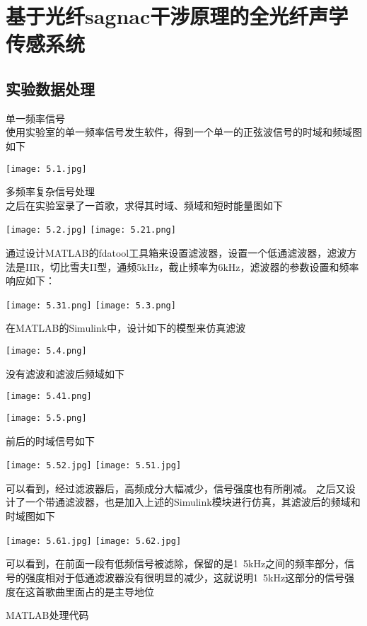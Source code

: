 \documentclass{zjureport}
\begin{document}
\section{基于光纤sagnac干涉原理的全光纤声学传感系统}
  \subsection{实验数据处理}
    \begin{clause}
    	\item 单一频率信号\\
    	使用实验室的单一频率信号发生软件，得到一个单一的正弦波信号的时域和频域图如下
    	\begin{center}
    		\texttt{[image: 5.1.jpg]}
    	\end{center}
       	\item 多频率复杂信号处理\\
       	之后在实验室录了一首歌，求得其时域、频域和短时能量图如下\\
       	\begin{center}
       		\texttt{[image: 5.2.jpg]}
       		\texttt{[image: 5.21.png]}
       	\end{center}
       通过设计MATLAB的fdatool工具箱来设置滤波器，设置一个低通滤波器，滤波方法是IIR，切比雪夫II型，通频5kHz，截止频率为6kHz，滤波器的参数设置和频率响应如下：
       \begin{center}
       	\texttt{[image: 5.31.png]}
       	\texttt{[image: 5.3.png]}
       \end{center}
   		在MATLAB的Simulink中，设计如下的模型来仿真滤波
   		\begin{center}
   			\texttt{[image: 5.4.png]}
   		\end{center}
   	没有滤波和滤波后频域如下
   	\begin{center}
   			\centering
   			\texttt{[image: 5.41.png]}
   		\end{center}
   	\begin{center}
   		\texttt{[image: 5.5.png]}
   	\end{center}
   前后的时域信号如下
   \begin{center}
   	\texttt{[image: 5.52.jpg]}
   	\texttt{[image: 5.51.jpg]}
   \end{center}
	可以看到，经过滤波器后，高频成分大幅减少，信号强度也有所削减。
    之后又设计了一个带通滤波器，也是加入上述的Simulink模块进行仿真，其滤波后的频域和时域图如下
     \begin{center}
    	\texttt{[image: 5.61.jpg]}
    	\texttt{[image: 5.62.jpg]}
    \end{center}
	可以看到，在前面一段有低频信号被滤除，保留的是1~5kHz之间的频率部分，信号的强度相对于低通滤波器没有很明显的减少，这就说明1~5kHz这部分的信号强度在这首歌曲里面占的是主导地位
    	\item MATLAB处理代码
    	

\end{clause}
\end{document}
